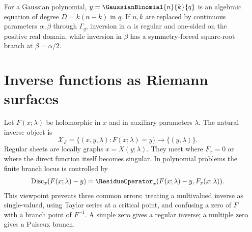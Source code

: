 \documentclass[11pt,oneside]{book}
\theoremstyle{definition}
\theoremstyle{remark}
\newcommand{\Disc}{\operatorname{Disc}}
\begin{document}
For a Gaussian polynomial, $y=\GaussianBinomial{n}{k}{q}$ is an algebraic equation of
degree $D=k(n-k)$ in $q$.  If $n,k$ are replaced by continuous parameters
$\alpha,\beta$ through $\Gamma_q$, inversion in $\alpha$ is regular and
one-sided on the positive real domain, while inversion in $\beta$ has a
symmetry-forced square-root branch at $\beta=\alpha/2$.

\section{Inverse functions as Riemann surfaces}
Let $F(x;\lambda)$ be holomorphic in $x$ and in auxiliary parameters
$\lambda$.  The natural inverse object is
\[
 \mathcal X_F=\{(x,y,\lambda):F(x;\lambda)=y\}
 \longrightarrow \{(y,\lambda)\}.
\]
Regular sheets are locally graphs $x=X(y;\lambda)$.  They meet where
$F_x=0$ or where the direct function itself becomes singular.  In polynomial
problems the finite branch locus is controlled by
\[
 \Disc_x(F(x;\lambda)-y)
 =\ResidueOperator_x(F(x;\lambda)-y,F_x(x;\lambda)).
\]
This viewpoint prevents three common errors: treating a multivalued inverse as
single-valued, using Taylor series at a critical point, and confusing a zero of
$F$ with a branch point of $F^{-1}$.  A simple zero gives a regular inverse;
a multiple zero gives a Puiseux branch.
\end{document}
